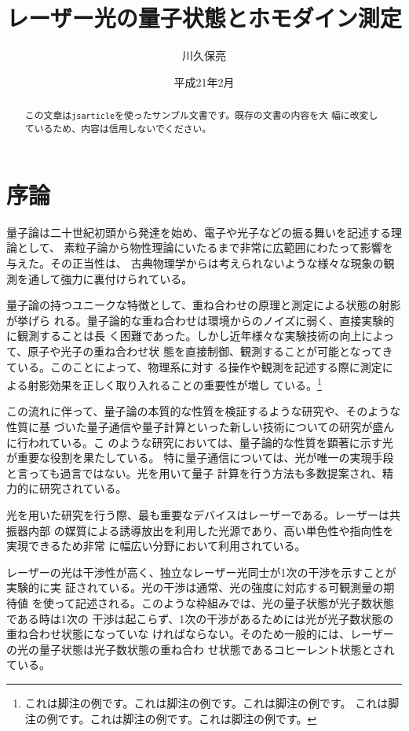 \documentclass[10pt]{jsarticle}
\title{レーザー光の量子状態とホモダイン測定}
\author{川久保亮}
\date{平成21年2月}
\begin{document}
\maketitle

\begin{abstract}
  この文章は\texttt{jsarticle}を使ったサンプル文書です。既存の文書の内容を大
  幅に改変しているため、内容は信用しないでください。
\end{abstract}

\section{序論}

量子論は二十世紀初頭から発達を始め、電子や光子などの振る舞いを記述する理論として、
素粒子論から物性理論にいたるまで非常に広範囲にわたって影響を与えた。その正当性は、
古典物理学からは考えられないような様々な現象の観測を通して強力に裏付けられている。

量子論の持つユニークな特徴として、重ね合わせの原理と測定による状態の射影が挙げら
れる。量子論的な重ね合わせは環境からのノイズに弱く、直接実験的に観測することは長
く困難であった。しかし近年様々な実験技術の向上によって、原子や光子の重ね合わせ状
態を直接制御、観測することが可能となってきている。このことによって、物理系に対す
る操作や観測を記述する際に測定による射影効果を正しく取り入れることの重要性が増し
ている。\footnote{これは脚注の例です。これは脚注の例です。これは脚注の例です。
これは脚注の例です。これは脚注の例です。これは脚注の例です。}

この流れに伴って、量子論の本質的な性質を検証するような研究や、そのような性質に基
づいた量子通信や量子計算といった新しい技術についての研究が盛んに行われている。こ
のような研究においては、量子論的な性質を顕著に示す光が重要な役割を果たしている。
特に量子通信については、光が唯一の実現手段と言っても過言ではない。光を用いて量子
計算を行う方法も多数提案され、精力的に研究されている。

光を用いた研究を行う際、最も重要なデバイスはレーザーである。レーザーは共振器内部
の媒質による誘導放出を利用した光源であり、高い単色性や指向性を実現できるため非常
に幅広い分野において利用されている。

レーザーの光は干渉性が高く、独立なレーザー光同士が1次の干渉を示すことが実験的に実
証されている\cite{Magyar1963}。光の干渉は通常、光の強度に対応する可観測量の期待値
を使って記述される。このような枠組みでは、光の量子状態が光子数状態である時は1次の
干渉は起こらず、1次の干渉があるためには光が光子数状態の重ね合わせ状態になっていな
ければならない。そのため一般的には、レーザーの光の量子状態は光子数状態の重ね合わ
せ状態であるコヒーレント状態とされている。
\end{document}

